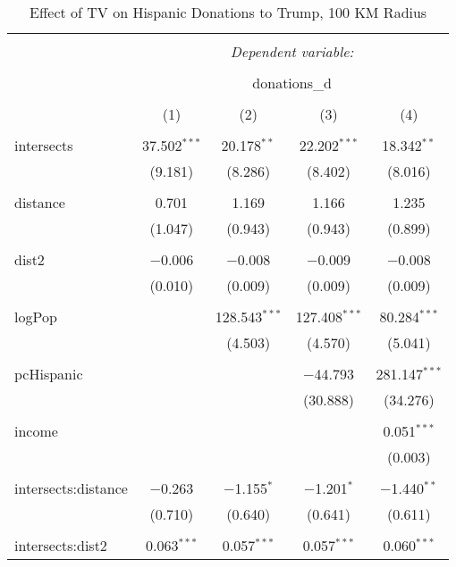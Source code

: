 
\begin{table}[!htbp] \centering 
  \caption{Effect of TV on Hispanic Donations to Trump, 100 KM Radius} 
  \label{} 
\begin{tabular}{@{\extracolsep{-5pt}}lcccc} 
\\[-1.8ex]\hline 
\hline \\[-1.8ex] 
 & \multicolumn{4}{c}{\textit{Dependent variable:}} \\ 
\cline{2-5} 
\\[-1.8ex] & \multicolumn{4}{c}{donations\_d} \\ 
\\[-1.8ex] & (1) & (2) & (3) & (4)\\ 
\hline \\[-1.8ex] 
 intersects & 37.502$^{***}$ & 20.178$^{**}$ & 22.202$^{***}$ & 18.342$^{**}$ \\ 
  & (9.181) & (8.286) & (8.402) & (8.016) \\ 
  & & & & \\ 
 distance & 0.701 & 1.169 & 1.166 & 1.235 \\ 
  & (1.047) & (0.943) & (0.943) & (0.899) \\ 
  & & & & \\ 
 dist2 & $-$0.006 & $-$0.008 & $-$0.009 & $-$0.008 \\ 
  & (0.010) & (0.009) & (0.009) & (0.009) \\ 
  & & & & \\ 
 logPop &  & 128.543$^{***}$ & 127.408$^{***}$ & 80.284$^{***}$ \\ 
  &  & (4.503) & (4.570) & (5.041) \\ 
  & & & & \\ 
 pcHispanic &  &  & $-$44.793 & 281.147$^{***}$ \\ 
  &  &  & (30.888) & (34.276) \\ 
  & & & & \\ 
 income &  &  &  & 0.051$^{***}$ \\ 
  &  &  &  & (0.003) \\ 
  & & & & \\ 
 intersects:distance & $-$0.263 & $-$1.155$^{*}$ & $-$1.201$^{*}$ & $-$1.440$^{**}$ \\ 
  & (0.710) & (0.640) & (0.641) & (0.611) \\ 
  & & & & \\ 
 intersects:dist2 & 0.063$^{***}$ & 0.057$^{***}$ & 0.057$^{***}$ & 0.060$^{***}$ \\ 

\end{tabular}
\end{table}
